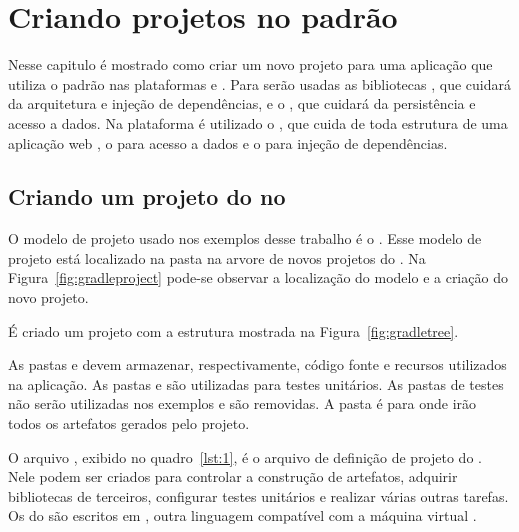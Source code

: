 \chapter{Criando projetos  no padrão }

Nesse capitulo é mostrado como criar um novo projeto para uma aplicação  que utiliza o padrão  nas plataformas \spring e \anmvc. Para  serão usadas as bibliotecas , que cuidará da arquitetura  e injeção de dependências, e o , que cuidará da persistência e acesso a dados. Na plataforma  é utilizado o , que cuida de toda estrutura de uma aplicação web , o  para acesso a dados e o  para injeção de dependências.

\section{Criando um projeto do  no }

O modelo de projeto usado nos exemplos desse trabalho é o . Esse modelo de projeto está localizado na pasta  na arvore de novos projetos do . Na Figura~\ref{fig:gradleproject} pode-se observar a localização do modelo e a criação do novo projeto.


É criado um projeto com a estrutura mostrada na Figura~\ref{fig:gradletree}.


As pastas  e  devem armazenar, respectivamente, código fonte  e recursos utilizados na aplicação.  As pastas  e  são utilizadas para testes unitários. As pastas de testes não serão utilizadas nos exemplos e são removidas. A pasta  é para onde irão todos os artefatos gerados pelo projeto.

O arquivo , exibido no quadro~\ref{lst:1}, é o arquivo de definição de projeto do . Nele podem ser criados  para controlar a construção de artefatos, adquirir bibliotecas de terceiros, configurar testes unitários e realizar várias outras tarefas. Os  do  são escritos em , outra linguagem compatível com a máquina virtual . 

